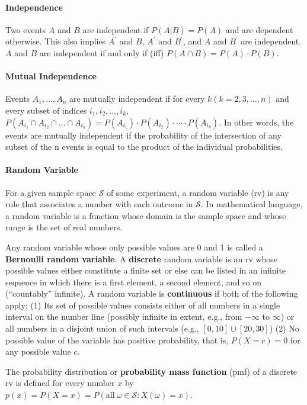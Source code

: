 \documentclass[paper=A4, pagesize, fontsize=6.95pt, DIV=calc]{scrartcl}
\begin{document}
\paragraph{Independence}
Two events $A$ and $B$ are independent if $P(A|B) = P(A)$ and are dependent otherwise. This also implies $A^\prime$ and $B$, $A^\prime$ and $B^\prime$, and $A$ and $B^\prime$ are independent. $A$ and $B$ are independent if and only if (iff) $P(A \cap B) = P(A) \cdot P(B)$.

\paragraph{Mutual Independence}
Events $A_1, \ldots, A_n$ are mutually independent if for every $k(k = 2, 3, \ldots, n)$ and every subset of indices $i_1, i_2, \ldots, i_k$, $P(A_{i_1} \cap A_{i_2} \cap \ldots \cap A_{i_k}) = P(A_{i_1}) \cdot P(A_{i_2}) \cdot \cdots \cdot P(A_{i_k})$. In other words, the events are mutually independent if the probability of the intersection of any subset of the n events is equal to the product of the individual probabilities.

\paragraph{Random Variable}
For a given sample space $\mathcal{S}$ of some experiment, a random variable (rv) is any rule that associates a number with each outcome in $\mathcal{S}$. In mathematical language, a random variable is a function whose domain is the sample space and whose range is the set of real numbers.

Any random variable whose only possible values are 0 and 1 is called a \textbf{Bernoulli random variable}. A \textbf{discrete} random variable is an rv whose possible values either constitute a finite set or else can be listed in an infinite sequence in which there is a first element, a second element, and so on (``countably'' infinite). A random variable is \textbf{continuous} if both of the following apply: (1) Its set of possible values consists either of all numbers in a single interval on the number line (possibly infinite in extent, e.g., from $-\infty$ to $\infty$) or all numbers in a disjoint union of such intervals (e.g., $[0, 10] \cup [20, 30]$) (2) No possible value of the variable has positive probability, that is, $P(X = c) = 0$ for any possible value $c$.

The probability distribution or \textbf{probability mass function} (pmf) of a discrete rv is defined for every number $x$ by $p(x) = P(X = x) = P(\text{all}\ \omega \in \mathcal{S}: X(\omega) = x)$.
\end{document}

